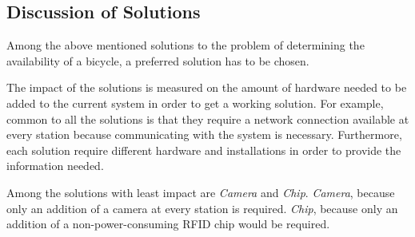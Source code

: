 \begin{comment}
\subsection{WiFi}\fxwarning{This doen't work, delete maybe?}
Using WiFi to transmit from the bicycles to the station if they are near, is another solution that could be used.
This solution captures the bicycles located in a perimeter around the station that are on the WiFi network.

This solution provides an estimate of the amount of bicycles available at a given station.
It requires very little in terms of extra infrastructure having to be built.

It is unclear what costs would be involved with this system and how the bicycles would be powered to maintain the WiFi signal for a longer period of time. 
Maintaining the WiFi signal for a longer period of time when not bicycling may not be necessary as you could assume that when a bicycle is not active, it stays at the same place.
If that is the case, it could be enough to transmit your position when near a station and bicycling, thus powering the WiFi with kinetic energy.
\end{comment}

\subsection{Discussion of Solutions}
Among the above mentioned solutions to the problem of determining the availability of a bicycle, a preferred solution has to be chosen. 

The impact of the solutions is measured on the amount of hardware needed to be added to the current system in order to get a working solution. 
For example, common to all the solutions is that they require a network connection available at every station because communicating with the system is necessary. 
Furthermore, each solution require different hardware and installations in order to provide the information needed. 

Among the solutions with least impact are \textit{Camera} and \textit{Chip}. 
\textit{Camera}, because only an addition of a camera at every station is required. 
\textit{Chip}, because only an addition of a non-power-consuming RFID chip would be required.

